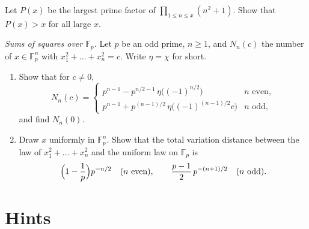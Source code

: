 \begin{exercise}[$\star\star\star$]\label{pb:nsq1}
Let $P(x)$ be the largest prime factor of $\prod_{1\le n\le x}(n^2+1)$. Show that $P(x)>x$ for all large $x$.
\end{exercise}

\begin{exercise}[$\star\star$]\label{pb:sumsquares}
\emph{Sums of squares over $\mathbb F_p$.} Let $p$ be an odd prime, $n\ge1$, and $N_n(c)$ the number of $x\in\mathbb F_p^n$ with
$x_1^2+\dots+x_n^2=c$. Write $\eta=\chi$ for short.
\begin{enumerate}[label=(\alph*)]
\item Show that for $c\ne0$,
\[
N_n(c)=\begin{cases}p^{n-1}-p^{n/2-1}\,\eta\bigl((-1)^{n/2}\bigr)&n\text{ even},\\[2pt]
p^{n-1}+p^{(n-1)/2}\,\eta\bigl((-1)^{(n-1)/2}c\bigr)&n\text{ odd},\end{cases}
\]
and find $N_n(0)$.
\item Draw $x$ uniformly in $\mathbb F_p^n$. Show that the total variation distance between the law of $x_1^2+\dots+x_n^2$ and
the uniform law on $\mathbb F_p$ is
\[
\Bigl(1-\frac1p\Bigr)p^{-n/2}\quad(n\text{ even}),\qquad\frac{p-1}2\,p^{-(n+1)/2}\quad(n\text{ odd}).
\]
\end{enumerate}
\end{exercise}

\section{Hints}

